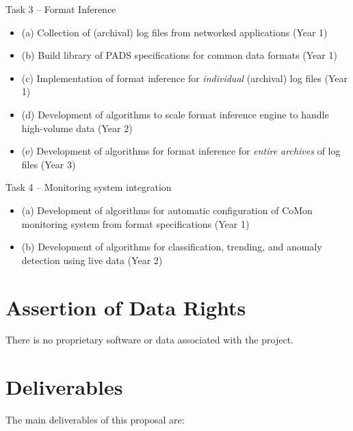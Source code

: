 \documentclass[12pt]{article}
\begin{document}
\noindent
Task 3 -- Format Inference
\begin{itemize}
\item (a) Collection of (archival) log files from networked applications (Year 1)
\item (b) Build library of PADS specifications for common data formats (Year 1)
\item (c) Implementation of format inference for {\em individual} (archival) log files (Year 1)
\item (d) Development of algorithms to scale format inference engine to handle high-volume data (Year 2)
\item (e) Development of algorithms for format inference for {\em entire archives} of log files (Year 3)
\end{itemize}

\noindent
Task 4 -- Monitoring system integration
\begin{itemize}
\item (a) Development of algorithms for automatic configuration of CoMon monitoring system from format specifications (Year 1)
\item (b) Development of algorithms for classification, trending, and 
anomaly detection using live data (Year 2)
\end{itemize}




\section{Assertion of Data Rights}

There is no proprietary software or data associated with the project.

\section{Deliverables}

The main deliverables of this proposal are:
\end{document}
